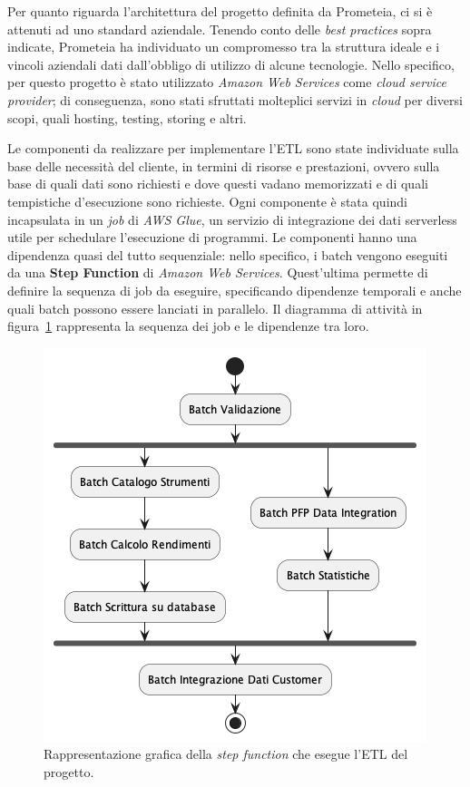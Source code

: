 Per quanto riguarda l'architettura del progetto definita da Prometeia, ci si è attenuti ad uno standard aziendale.
Tenendo conto delle \textit{best practices} sopra indicate, Prometeia ha individuato un compromesso tra la struttura ideale e i vincoli aziendali dati dall'obbligo di utilizzo di alcune tecnologie.
Nello specifico, per questo progetto è stato utilizzato \textit{Amazon Web Services} come \textit{cloud service provider};
di conseguenza, sono stati sfruttati molteplici servizi in \textit{cloud} per diversi scopi, quali hosting, testing, storing e altri.

Le componenti da realizzare per implementare l'ETL sono state individuate sulla base delle necessità del cliente, in termini di risorse e prestazioni, ovvero sulla base di quali dati sono richiesti e dove questi vadano memorizzati e di quali tempistiche d'esecuzione sono richieste.
Ogni componente è stata quindi incapsulata in un \textit{job} di \textit{AWS Glue}, un servizio di integrazione dei dati serverless~\cite{aws-glue} utile per schedulare l'esecuzione di programmi.
Le componenti hanno una dipendenza quasi del tutto sequenziale:
nello specifico, i batch vengono eseguiti da una \textbf{Step Function} di \textit{Amazon Web Services}.
Quest'ultima permette di definire la sequenza di job da eseguire, specificando dipendenze temporali e anche quali batch possono essere lanciati in parallelo.
Il diagramma di attività in figura~\ref{fig:batch-dependency} rappresenta la sequenza dei job e le dipendenze tra loro.
\begin{figure}
    \includegraphics[width=.6\textwidth]{img/batch-dependency.png}
    \centering
    \caption{Rappresentazione grafica della \textit{step function} che esegue l'ETL del progetto.}
    \label{fig:batch-dependency}
\end{figure}

